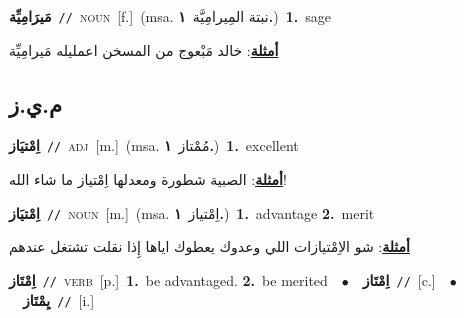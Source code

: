 \documentclass[10pt,a4paper,twoside]{article} %
\begin{document}
\begin{multicols}{2}
{\setlength\topsep{0pt}\textbf{\foreignlanguage{arabic}{مَيرَامِيِّة}}\ {\color{gray}\texttt{//}\color{black}}\ \textsc{noun}\ [f.]\ \color{gray}(msa. \foreignlanguage{arabic}{نبتة المِيرامِيَّة}~\foreignlanguage{arabic}{\textbf{١.}})\color{black}\ \textbf{1.}~sage\  \begin{flushright}\color{gray}\foreignlanguage{arabic}{\textbf{\underline{\foreignlanguage{arabic}{أمثلة}}}: خالد مَبْعوج من المسخن اعمليله مَيرامِيِّة}\end{flushright}\color{black}} \vspace{2mm}

\vspace{-3mm}
\subsection*{\color{blue}\foreignlanguage{arabic}{م.ي.ز}\color{blue}{}} 

{\setlength\topsep{0pt}\textbf{\foreignlanguage{arabic}{اِمْتيَاز}}\ {\color{gray}\texttt{//}\color{black}}\ \textsc{adj}\ [m.]\ \color{gray}(msa. \foreignlanguage{arabic}{مُمْتاز}~\foreignlanguage{arabic}{\textbf{١.}})\color{black}\ \textbf{1.}~excellent\  \begin{flushright}\color{gray}\foreignlanguage{arabic}{\textbf{\underline{\foreignlanguage{arabic}{أمثلة}}}: الصبية شطورة ومعدلها اِمْتياز ما شاء الله!}\end{flushright}\color{black}} \vspace{2mm}

{\setlength\topsep{0pt}\textbf{\foreignlanguage{arabic}{اِمْتيَاز}}\ {\color{gray}\texttt{//}\color{black}}\ \textsc{noun}\ [m.]\ \color{gray}(msa. \foreignlanguage{arabic}{اِمْتياز}~\foreignlanguage{arabic}{\textbf{١.}})\color{black}\ \textbf{1.}~advantage  \textbf{2.}~merit\  \begin{flushright}\color{gray}\foreignlanguage{arabic}{\textbf{\underline{\foreignlanguage{arabic}{أمثلة}}}: شو الاِمْتيازات اللي وعدوك يعطوك اياها إِذا نقلت تشتغل عندهم}\end{flushright}\color{black}} \vspace{2mm}

{\setlength\topsep{0pt}\textbf{\foreignlanguage{arabic}{اِمْتَاز}}\ {\color{gray}\texttt{//}\color{black}}\ \textsc{verb}\ [p.]\ \textbf{1.}~be advantaged.  \textbf{2.}~be merited\ \ $\bullet$\ \ \setlength\topsep{0pt}\textbf{\foreignlanguage{arabic}{اِمْتَاز}}\ {\color{gray}\texttt{//}\color{black}}\ [c.]\ \ $\bullet$\ \ \setlength\topsep{0pt}\textbf{\foreignlanguage{arabic}{يِمْتَاز}}\ {\color{gray}\texttt{//}\color{black}}\ [i.]\ } \vspace{2mm}


\end{multicols}
\end{document}
